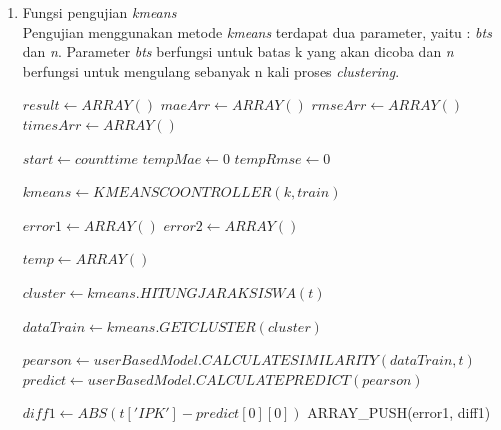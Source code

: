 \begin{enumerate}
    \item Fungsi pengujian \textit{kmeans}\\
        Pengujian menggunakan metode \textit{kmeans} terdapat dua parameter, yaitu : \textit{bts} dan \textit{n}. Parameter \textit{bts} berfungsi untuk batas k yang akan dicoba dan \textit{n} berfungsi untuk mengulang sebanyak n kali proses \textit{clustering}.
        
        \begin{algorithm}[H]
            \begin{algorithmic}[1]
                   \State $result \gets ARRAY()$
                   \State $maeArr \gets ARRAY()$
                   \State $rmseArr \gets ARRAY()$
                   \State $timesArr \gets ARRAY()$
                   
                        \State $start \gets count time$
                        \State $tempMae \gets 0$
                        \State $tempRmse \gets 0$
                        
                            \State $kmeans \gets KMEANSCOONTROLLER(k, train)$
                            
                            \State $error1 \gets ARRAY()$
                            \State $error2 \gets ARRAY()$
                            
                                    \State $temp \gets ARRAY()$
                                    
                                    \State $cluster \gets kmeans.HITUNGJARAKSISWA(t)$
                                    
                                    \State $dataTrain \gets kmeans.GETCLUSTER(cluster)$
                                    
                                    \State $pearson \gets userBasedModel.CALCULATESIMILARITY(dataTrain, t)$
                                    \State $predict \gets userBasedModel.CALCULATEPREDICT(pearson)$
                                    
                                        \State $diff1 \gets ABS(t['IPK'] - predict[0][0])$
                                        \State ARRAY\_PUSH(error1, diff1)
                                        

\end{algorithmic}
\end{algorithm}
\end{enumerate}

